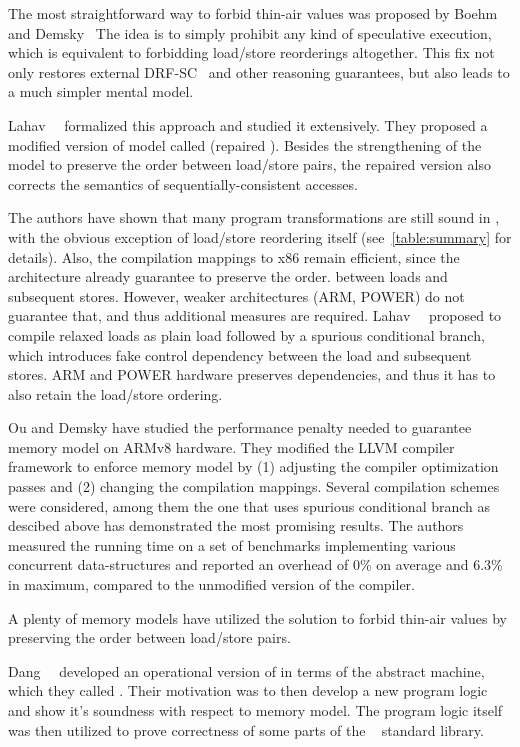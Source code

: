 The most straightforward way to forbid thin-air values 
was proposed by Boehm and Demsky~\cite{Boehm-Demsky:MSPC14}
The idea is to simply prohibit any kind of speculative execution, 
which is equivalent to forbidding load/store reorderings altogether. 
This fix not only restores external DRF-SC~\cite{Lahav-al:PLDI17}
and other reasoning guarantees, but also leads to 
a much simpler mental model.  

Lahav~\etal~\cite{Lahav-al:PLDI17} formalized this approach and 
studied it extensively. They proposed a modified version 
of \CPP model called \RCMM (repaired \CMM).  
Besides the strengthening of the model to preserve 
the order between load/store pairs, 
the repaired version also corrects the semantics 
of sequentially-consistent accesses.

The authors have shown that many 
program transformations are still sound in \RCMM, 
with the obvious exception of load/store reordering itself
(see~\cref{table:summary} for details).
Also, the compilation mappings to x86 remain efficient, 
since the architecture already guarantee to preserve the order. 
between loads and subsequent stores. 
However, weaker architectures (ARM, POWER) do not guarantee that, 
and thus additional measures are required.
Lahav~\etal~\cite{Lahav-al:PLDI17} proposed to compile relaxed loads 
as plain load followed by a spurious conditional branch,
which introduces fake control dependency between 
the load and subsequent stores. 
ARM and POWER hardware preserves dependencies, 
and thus it has to also retain the load/store ordering. 

Ou and Demsky \cite{Ou-Demsky:OOPSLA18} have studied 
the performance penalty needed to guarantee 
\RCMM memory model on ARMv8 hardware.
They modified the LLVM compiler framework 
to enforce \RCMM memory model
by (1) adjusting the compiler optimization passes and 
(2) changing the compilation mappings.
Several compilation schemes were considered,
among them the one that uses spurious conditional branch
as descibed above has demonstrated the most promising results.  
The authors measured the running time on a set of benchmarks 
implementing various concurrent data-structures
and reported an overhead of 0\% on average and 6.3\% in maximum,
compared to the unmodified version of the compiler. 

A plenty of memory models have utilized the \RCMM
solution to forbid thin-air values by 
preserving the order between load/store pairs. 

Dang~\etal~\cite{Dang-el:POPL19} developed an operational 
version of \RCMM in terms of the abstract machine, 
which they called \ORCMM. Their motivation was to 
then develop a new program logic and show it's soundness
with respect to \ORCMM memory model. 
The program logic itself was then utilized to 
prove correctness of some parts of 
the \Rust~\cite{RustBook:19} standard library.

